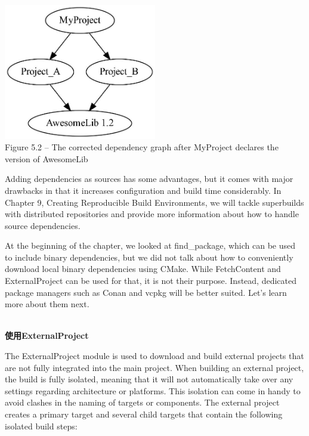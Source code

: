 \begin{center}
\includegraphics[width=0.5\textwidth]{content/2/chapter5/images/2.jpg}\\
Figure 5.2 – The corrected dependency graph after MyProject declares the version of AwesomeLib
\end{center}

Adding dependencies as sources has some advantages, but it comes with major drawbacks in that it increases configuration and build time considerably. In Chapter 9, Creating Reproducible Build Environments, we will tackle superbuilds with distributed repositories and provide more information about how to handle source dependencies.

At the beginning of the chapter, we looked at find\_package, which can be used to include binary dependencies, but we did not talk about how to conveniently download local binary dependencies using CMake. While FetchContent and ExternalProject can be used for that, it is not their purpose. Instead, dedicated package managers such as Conan and vcpkg will be better suited. Let's learn more about them next.

\hspace*{\fill} \\ %
\noindent
\textbf{使用ExternalProject}

The ExternalProject module is used to download and build external projects that are not fully integrated into the main project. When building an external project, the build is fully isolated, meaning that it will not automatically take over any settings regarding architecture or platforms. This isolation can come in handy to avoid clashes in the naming of targets or components. The external project creates a primary target and several child targets that contain the following isolated build steps:

